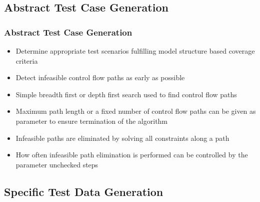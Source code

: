 \documentclass{beamer}
\begin{document}

\subsection{Abstract Test Case Generation}
\begin{frame}
\frametitle{Abstract Test Case Generation}
\begin{itemize} 
\item Determine appropriate test scenarios fulfilling model structure based coverage criteria
\item Detect infeasible control flow paths as early as possible
\end{itemize}
\vspace{0.3cm}
\begin{itemize} 
\item Simple breadth first or depth first search used to find control flow paths
\item Maximum path length or a fixed number of control flow paths can be given as parameter to ensure termination of the algorithm
\item Infeasible paths are eliminated by solving all constraints along a path
\item How often infeasible path elimination is performed can be controlled by the parameter unchecked steps
\end{itemize}
\end{frame} 


\subsection{Specific Test Data Generation}
\end{document}
